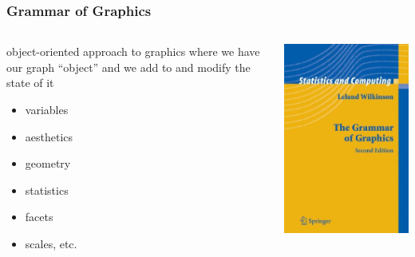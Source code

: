 \documentclass{beamer}\usepackage{graphicx, color}
\begin{document}
\begin{frame}
  \frametitle{Grammar of Graphics}
  \begin{columns}
    \begin{column}{0.5\textwidth}
      object-oriented approach to graphics where we have our graph ``object'' and we add to and modify the state of it
      \begin{itemize}
        \item variables
        \item aesthetics
        \item geometry
        \item statistics
        \item facets
        \item scales, etc.
      \end{itemize}
    \end{column}
    \begin{column}{0.5\textwidth}
      \includegraphics[width = \textwidth, keepaspectratio = true]{figure/grammar}
    \end{column}
  \end{columns}

\end{frame}
\end{document}
